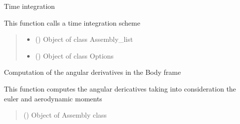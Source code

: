 \documentclass[letterpaper,10pt,english]{sphinxmanual}
\begin{document}
\begin{fulllineitems}
\label{\detokenize{modules:dynamics.integrate}}
\pysigstartsignatures
{}
\pysigstopsignatures
\sphinxAtStartPar
Time integration

\sphinxAtStartPar
This function calls a time integration scheme
\begin{quote}\begin{description}
\begin{itemize}
\item {} 
\sphinxAtStartPar
{} ({\hyperref[\detokenize{modules:assembly.Assembly_list}]{}}) \textendash{} Object of class Assembly\_list

\item {} 
\sphinxAtStartPar
{} ({\hyperref[\detokenize{modules:configuration.Options}]{}}) \textendash{} Object of class Options

\end{itemize}

\end{description}\end{quote}

\end{fulllineitems}


\begin{fulllineitems}
\label{\detokenize{modules:dynamics.compute_angular_derivatives}}
\pysigstartsignatures
{}
\pysigstopsignatures
\sphinxAtStartPar
Computation of the angular derivatives in the Body frame

\sphinxAtStartPar
This function computes the angular dericatives taking into consideration the euler and aerodynamic moments
\begin{quote}\begin{description}
\sphinxAtStartPar
{} ({\hyperref[\detokenize{modules:assembly.Assembly}]{}}) \textendash{} Object of Assembly class

\end{description}\end{quote}

\end{fulllineitems}
\end{document}
